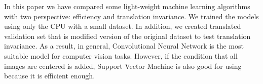 \documentclass[main.tex]{subfiles}
\begin{document}
In this paper we have compared some light-weight machine learning algorithms with two perspective: efficiency and translation invariance.
We trained the models using only the CPU with a small dataset.
In addition, we created translated validation set that is modified version of the original dataset to test translation invariance.
As a result, in general, Convolutional Neural Network is the most suitable model for computer vision tasks.
However, if the condition that all images are centered is added, Support Vector Machine is also good for using because it is efficient enough.
\end{document}
